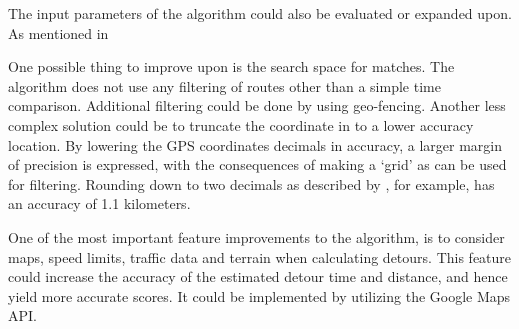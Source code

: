 The input parameters of the algorithm could also be evaluated or expanded upon.
As mentioned in 

One possible thing to improve upon is the search space for matches.
The algorithm does not use any filtering of routes other than a simple time comparison.
Additional filtering could be done by using geo-fencing.
Another less complex solution could be to truncate the coordinate in to a lower accuracy location.
By lowering the GPS coordinates decimals in accuracy, a larger margin of precision is expressed, with the consequences of making a `grid' as can be used for filtering.
Rounding down to two decimals as described by \citet{gpsdecimal}, for example, has an accuracy of 1.1 kilometers.

One of the most important feature improvements to the algorithm, is to consider maps, speed limits, traffic data and terrain when calculating detours.
This feature could increase the accuracy of the estimated detour time and distance, and hence yield more accurate scores.
It could be implemented by utilizing the Google Maps API.

